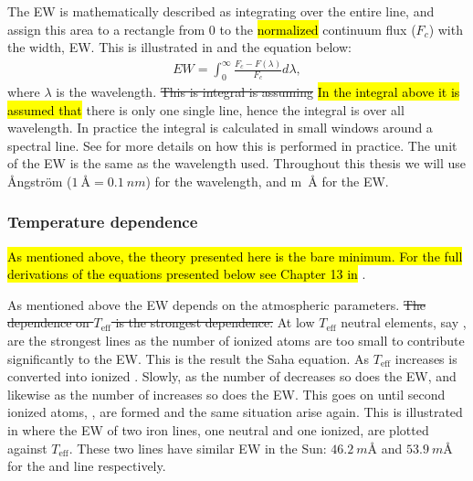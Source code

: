 The EW is mathematically described as integrating over the entire line, and assign this area to a
rectangle from 0 to the \hl{normalized} continuum flux ($F_c$) with the width, EW. This is
illustrated in  and the equation below:
\begin{align} EW = \int_{0}^{\infty}
  \frac{F_c-F(\lambda)}{F_c} d\lambda,
\end{align}
where $\lambda$ is the wavelength. \st{This is integral is assuming} \hl{In the integral above it is
assumed that} there is only one single line, hence the integral is over all wavelength. In practice
the integral is calculated in small windows around a spectral line. See  for
more details on how this is performed in practice. The unit of the EW is the same as the wavelength
used. Throughout this thesis we will use \AA{}ngstr\"{o}m ($\SI{1}{\angstrom}=\SI{0.1}{nm}$) for the
wavelength, and \si{m\angstrom} for the EW.


\subsubsection{Temperature dependence}

\hl{As mentioned above, the theory presented here is the bare minimum. For the full derivations of
the equations presented below see Chapter 13 in} \citet{Gray2006}.

As mentioned above the EW depends on the atmospheric parameters. \st{The dependence on
$T_\mathrm{eff}$ is the strongest dependence.} At low $T_\mathrm{eff}$ neutral elements, say
, are the strongest lines as the number of ionized atoms are too small to contribute
significantly to the EW. This is the result the Saha equation. As $T_\mathrm{eff}$ increases
 is converted into ionized . Slowly, as the number of  decreases
so does the EW, and likewise as the number of  increases so does the EW. This goes on
until second ionized atoms, , are formed and the same situation arise again. This is
illustrated in  where the EW of two iron lines, one neutral and one ionized, are
plotted against $T_\mathrm{eff}$. These two lines have similar EW in the Sun:
$\SI{46.2}{m\angstrom}$ and $\SI{53.9}{m\angstrom}$ for the  and  line
respectively.

